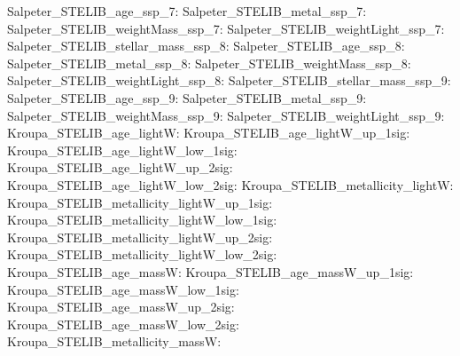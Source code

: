 Salpeter\_STELIB\_age\_ssp\_7:  \newline 
Salpeter\_STELIB\_metal\_ssp\_7:  \newline 
Salpeter\_STELIB\_weightMass\_ssp\_7:  \newline 
Salpeter\_STELIB\_weightLight\_ssp\_7:  \newline 
Salpeter\_STELIB\_stellar\_mass\_ssp\_8:  \newline 
Salpeter\_STELIB\_age\_ssp\_8:  \newline 
Salpeter\_STELIB\_metal\_ssp\_8:  \newline 
Salpeter\_STELIB\_weightMass\_ssp\_8:  \newline 
Salpeter\_STELIB\_weightLight\_ssp\_8:  \newline 
Salpeter\_STELIB\_stellar\_mass\_ssp\_9:  \newline 
Salpeter\_STELIB\_age\_ssp\_9:  \newline 
Salpeter\_STELIB\_metal\_ssp\_9:  \newline 
Salpeter\_STELIB\_weightMass\_ssp\_9:  \newline 
Salpeter\_STELIB\_weightLight\_ssp\_9:  \newline 
Kroupa\_STELIB\_age\_lightW:  \newline 
Kroupa\_STELIB\_age\_lightW\_up\_1sig:  \newline 
Kroupa\_STELIB\_age\_lightW\_low\_1sig:  \newline 
Kroupa\_STELIB\_age\_lightW\_up\_2sig:  \newline 
Kroupa\_STELIB\_age\_lightW\_low\_2sig:  \newline 
Kroupa\_STELIB\_metallicity\_lightW:  \newline 
Kroupa\_STELIB\_metallicity\_lightW\_up\_1sig:  \newline 
Kroupa\_STELIB\_metallicity\_lightW\_low\_1sig:  \newline 
Kroupa\_STELIB\_metallicity\_lightW\_up\_2sig:  \newline 
Kroupa\_STELIB\_metallicity\_lightW\_low\_2sig:  \newline 
Kroupa\_STELIB\_age\_massW:  \newline 
Kroupa\_STELIB\_age\_massW\_up\_1sig:  \newline 
Kroupa\_STELIB\_age\_massW\_low\_1sig:  \newline 
Kroupa\_STELIB\_age\_massW\_up\_2sig:  \newline 
Kroupa\_STELIB\_age\_massW\_low\_2sig:  \newline 
Kroupa\_STELIB\_metallicity\_massW:  \newline 
